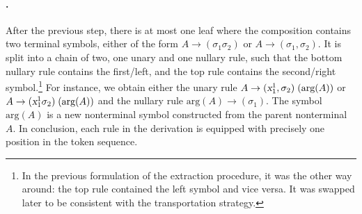 \documentclass[../../document.tex]{subfiles}
\begin{document}


    \paragraph{.}
    After the previous step, there is at most one leaf where the  composition contains two terminal symbols, either of the form \(A \to (\sigma_1 \sigma_2)\) or \(A \to (\sigma_1, \sigma_2)\).
    It is split into a chain of two, one unary and one nullary rule, such that the bottom nullary rule contains the first/left, and the top rule contains the second/right symbol.\footnote{
        In the previous formulation of the extraction procedure, it was the other way around: the top rule contained the left symbol and vice versa.
        It was swapped later to be consistent with the transportation strategy.
    }
    For instance, we obtain either the unary rule \(A \to (\textsl{x}_1^1, \sigma_2)\;(\text{arg}(A))\) or \(A \to (\textsl{x}_1^1 \sigma_2)\;(\text{arg}(A))\) and the nullary rule \(\text{arg}(A) \to (\sigma_1)\).
    The symbol \(\text{arg}(A)\) is a new nonterminal symbol constructed from the parent  nonterminal \(A\).
    In conclusion, each rule in the derivation is equipped with precisely one position in the token sequence.
\end{document}
